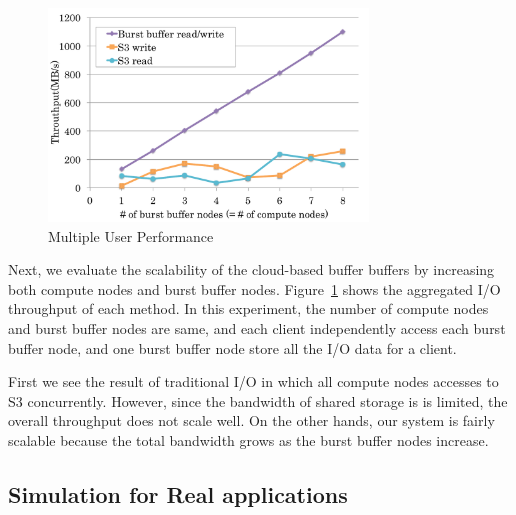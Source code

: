 \begin{figure}
\centering
\includegraphics[width=8.5cm]{img/multiple_client-2.pdf}
\caption{Multiple User Performance}
\label{evaluation:multiple user performance}
\end{figure}
Next, we evaluate the scalability of the
cloud-based buffer buffers by increasing both compute nodes and burst
buffer nodes.
Figure~\ref{evaluation:multiple user performance} shows the aggregated
I/O throughput of each method. In this experiment, the number of compute nodes
and burst buffer nodes are same, and each client independently
access each burst buffer node, and one burst buffer node store all the I/O
data for a client.

First we see the result of traditional I/O in which all compute nodes
accesses to S3 concurrently.
However, since the bandwidth of shared storage is is limited, the overall
throughput does not scale well. On the other hands, our system is fairly
scalable because the total bandwidth grows as the burst buffer nodes increase.

\subsection{Simulation for Real applications}


